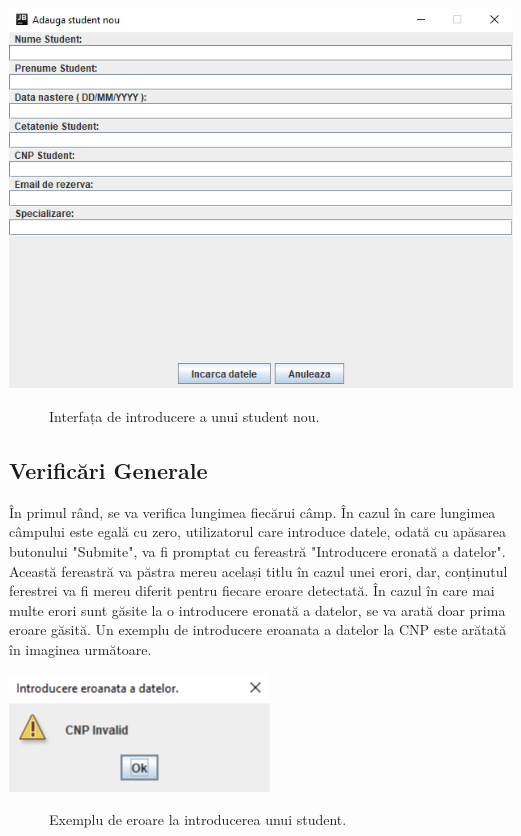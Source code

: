 \documentclass{article}
\begin{document}
	\begin{center}
		\includegraphics[scale=0.8]{Source/StudentNou}
		\begin{figure}[!h]
			{\caption*{Interfața de introducere a unui student nou.}}
		\end{figure}
	\end{center}

		\subsection*{Verificări Generale}
		În primul rând, se va verifica lungimea fiecărui câmp. În cazul în care lungimea câmpului este egală cu zero, utilizatorul care introduce datele, odată cu apăsarea butonului "Submite", va fi promptat cu fereastră "Introducere eronată a datelor". Această fereastră va păstra mereu același titlu în cazul unei erori, dar, conținutul ferestrei va fi mereu diferit pentru fiecare eroare detectată. În cazul în care mai multe erori sunt găsite la o introducere eronată a datelor, se va arată doar prima eroare găsită. Un exemplu de introducere eroanata a datelor la CNP este arătată în imaginea următoare.

	\begin{center}
		\includegraphics[scale=1]{Source/StudentNouEroare}
		\begin{figure}[!h]
			{\caption*{Exemplu de eroare la introducerea unui student.}}
		\end{figure}
	\end{center}
	
\end{document}
